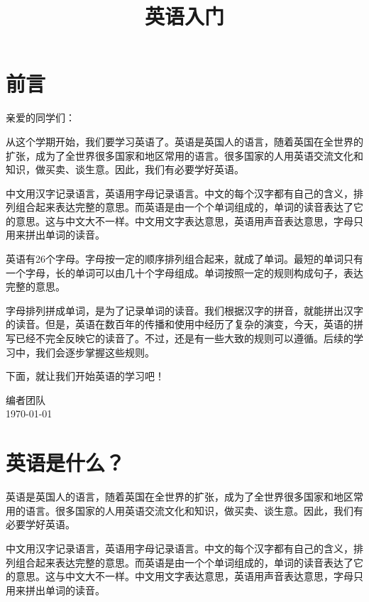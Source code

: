 \documentclass[10.5pt, a4paper]{ctexbook} %
\title{\zihao{0} \bfseries 英语入门}
\author{}
\date{}
\begin{document}
\maketitle

\frontmatter %
\chapter*{前言} %

亲爱的同学们：

从这个学期开始，我们要学习英语了。英语是英国人的语言，随着英国在全世界的扩张，成为了全世界很多国家和地区常用的语言。很多国家的人用英语交流文化和知识，做买卖、谈生意。因此，我们有必要学好英语。

中文用汉字记录语言，英语用字母记录语言。中文的每个汉字都有自己的含义，排列组合起来表达完整的意思。而英语是由一个个单词组成的，单词的读音表达了它的意思。这与中文大不一样。中文用文字表达意思，英语用声音表达意思，字母只用来拼出单词的读音。

英语有26个字母。字母按一定的顺序排列组合起来，就成了单词。最短的单词只有一个字母，长的单词可以由几十个字母组成。单词按照一定的规则构成句子，表达完整的意思。

字母排列拼成单词，是为了记录单词的读音。我们根据汉字的拼音，就能拼出汉字的读音。但是，英语在数百年的传播和使用中经历了复杂的演变，今天，英语的拼写已经不完全反映它的读音了。不过，还是有一些大致的规则可以遵循。后续的学习中，我们会逐步掌握这些规则。

下面，就让我们开始英语的学习吧！

\vfill %
\begin{flushright}
编者团队 \\
\today
\end{flushright}


\mainmatter %
\tableofcontents

\chapter{英语是什么？}

英语是英国人的语言，随着英国在全世界的扩张，成为了全世界很多国家和地区常用的语言。很多国家的人用英语交流文化和知识，做买卖、谈生意。因此，我们有必要学好英语。

中文用汉字记录语言，英语用字母记录语言。中文的每个汉字都有自己的含义，排列组合起来表达完整的意思。而英语是由一个个单词组成的，单词的读音表达了它的意思。这与中文大不一样。中文用文字表达意思，英语用声音表达意思，字母只用来拼出单词的读音。
\end{document}
